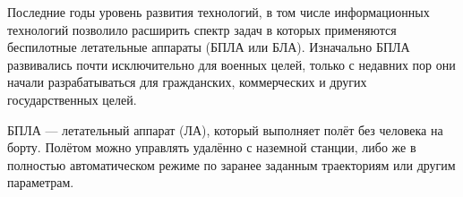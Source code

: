 \documentclass[specification,annotation]{itmo-student-thesis}
\begin{document}


\researchsummary{<++>}




\tableofcontents

\startprefacepage

Последние годы уровень развития технологий, в том числе информационных
технологий позволило расширить спектр задач в которых применяются беспилотные
летательные аппараты (БПЛА или БЛА). Изначально БПЛА развивались почти
исключительно для военных целей, только с недавних пор они начали
разрабатываться для гражданских, коммерческих и других государственных целей.

БПЛА --- летательный аппарат (ЛА), который выполняет полёт без человека на борту.
Полётом можно управлять удалённо с наземной станции, либо же в полностью
автоматическом режиме по заранее заданным траекториям или другим параметрам.
\end{document}
